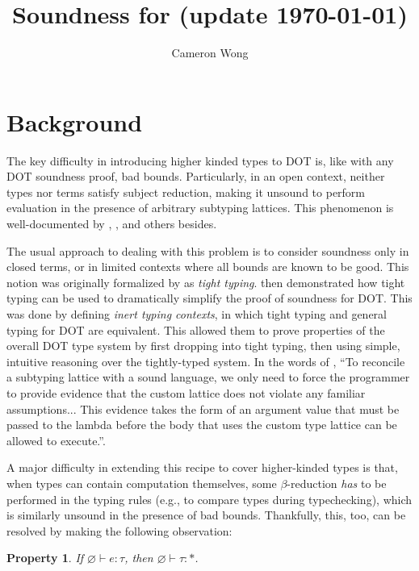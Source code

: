 \documentclass[a4paper, 10pt]{article}
\title{Soundness for \DOTw{} (update \today)}
\author{Cameron Wong}
\newtheorem{property}{Property}
\begin{document}
\maketitle

\setlength{\parskip}{\baselineskip}

\section{Background}

The key difficulty in introducing higher kinded types to DOT is, like with any
DOT soundness proof, bad bounds. Particularly, in an open context, neither
types nor terms satisfy subject reduction, making it unsound to perform
evaluation in the presence of arbitrary subtyping lattices. This phenomenon
is well-documented by \citet{amin2016}, \citet{rapoport2017},
\citet{stucki2021} and others besides.

The usual approach to dealing with this problem is to consider soundness only
in closed terms, or in limited contexts where all bounds are known to be good.
This notion was originally formalized by \citet{amin2016} as \emph{tight
typing}. \citet{rapoport2017} then demonstrated how tight typing can be used to
dramatically simplify the proof of soundness for DOT. This was done by defining
\emph{inert typing contexts}, in which tight typing and general typing for DOT
are equivalent. This allowed them to prove properties of the overall DOT type
system by first dropping into tight typing, then using simple, intuitive
reasoning over the tightly-typed system. In the words of \citet{rapoport2017},
``To reconcile a subtyping lattice with a sound language, we only need to force
the programmer to provide evidence that the custom lattice does not violate any
familiar assumptions... This evidence takes the form of an argument value that
must be passed to the lambda before the body that uses the custom type lattice
can be allowed to execute.''.

A major difficulty in extending this recipe to cover higher-kinded types is
that, when types can contain computation themselves, some $\beta$-reduction
\emph{has} to be performed in the typing rules (e.g., to compare types during
typechecking), which is similarly unsound in the presence of bad bounds.
Thankfully, this, too, can be resolved by making the following observation:

\begin{property}
  If $\varnothing \vdash e : \tau$, then $\varnothing \vdash \tau : *$.
\end{property}
\end{document}
